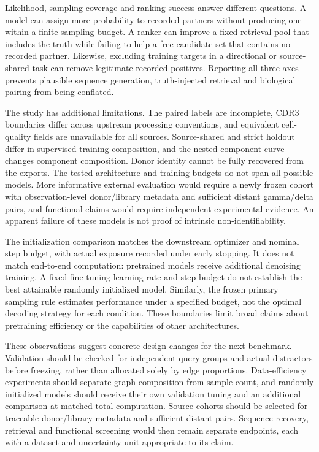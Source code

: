 \documentclass[12pt]{article}
\begin{document}
Likelihood, sampling coverage and ranking success answer different questions.
A model can assign more probability to recorded partners without producing one
within a finite sampling budget. A ranker can improve a fixed retrieval pool
that includes the truth while failing to help a free candidate set that contains
no recorded partner. Likewise, excluding training targets in a directional or
source-shared task can remove legitimate recorded positives. Reporting all three
axes prevents plausible sequence generation, truth-injected retrieval and
biological pairing from being conflated.

The study has additional limitations. The paired labels are incomplete, CDR3
boundaries differ across upstream processing conventions, and equivalent
cell-quality fields are unavailable for all sources. Source-shared and strict
holdout differ in supervised training composition, and the nested component
curve changes component composition. Donor identity cannot be fully recovered
from the exports. The tested architecture and training budgets do not span all
possible models. More informative external evaluation would require a newly
frozen cohort with observation-level donor/library metadata and sufficient
distant gamma/delta pairs, and functional claims would require independent
experimental evidence. An apparent failure of these models is not proof of
intrinsic non-identifiability.

The initialization comparison matches the downstream optimizer and nominal
step budget, with actual exposure recorded under early stopping. It does not
match end-to-end computation: pretrained models receive additional denoising
training. A fixed fine-tuning learning rate and step budget do not
establish the best attainable randomly initialized model. Similarly, the frozen
primary sampling rule estimates performance under a specified budget, not the
optimal decoding strategy for each condition. These boundaries limit broad
claims about pretraining efficiency or the capabilities of other architectures.

These observations suggest concrete design changes for the next benchmark.
Validation should be checked for independent query groups and actual distractors
before freezing, rather than allocated solely by edge proportions. Data-efficiency
experiments should separate graph composition from sample count, and randomly
initialized models should receive their own validation tuning and an additional
comparison at matched total computation. Source cohorts should be selected for
traceable donor/library metadata and sufficient distant pairs. Sequence recovery,
retrieval and functional screening would then remain separate endpoints, each
with a dataset and uncertainty unit appropriate to its claim.
\end{document}
